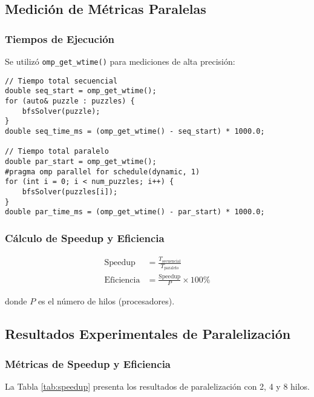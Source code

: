 \documentclass[12pt,a4paper]{article}
\begin{document}
\subsection{Medición de Métricas Paralelas}

\subsubsection{Tiempos de Ejecución}

Se utilizó \texttt{omp\_get\_wtime()} para mediciones de alta precisión:

\begin{lstlisting}
// Tiempo total secuencial
double seq_start = omp_get_wtime();
for (auto& puzzle : puzzles) {
    bfsSolver(puzzle);
}
double seq_time_ms = (omp_get_wtime() - seq_start) * 1000.0;

// Tiempo total paralelo
double par_start = omp_get_wtime();
#pragma omp parallel for schedule(dynamic, 1)
for (int i = 0; i < num_puzzles; i++) {
    bfsSolver(puzzles[i]);
}
double par_time_ms = (omp_get_wtime() - par_start) * 1000.0;
\end{lstlisting}

\subsubsection{Cálculo de Speedup y Eficiencia}

\begin{align}
\text{Speedup} &= \frac{T_{\text{secuencial}}}{T_{\text{paralelo}}} \\
\text{Eficiencia} &= \frac{\text{Speedup}}{P} \times 100\%
\end{align}

donde $P$ es el número de hilos (procesadores).

\subsection{Resultados Experimentales de Paralelización}

\subsubsection{Métricas de Speedup y Eficiencia}

La Tabla \ref{tab:speedup} presenta los resultados de paralelización con 2, 4 y 8 hilos.
\end{document}
